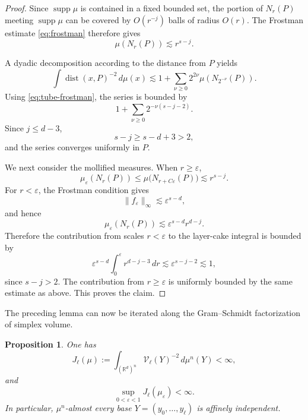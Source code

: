 \documentclass[11pt]{article}
\newtheorem{proposition}[theorem]{Proposition}
\theoremstyle{remark}
\newcommand{\R}{\mathbb R}
\newcommand{\supp}{\operatorname{supp}}
\newcommand{\dist}{\operatorname{dist}}
\newcommand{\eps}{\varepsilon}
\numberwithin{equation}{section}
\newcommand{\1}{\mathbf 1}
\begin{document}
\begin{proof}
Since \(\supp\mu\) is contained in a fixed bounded set, the portion of
\(N_r(P)\) meeting \(\supp\mu\) can be covered by \(O(r^{-j})\) balls
of radius \(O(r)\).  The Frostman estimate \eqref{eq:frostman} therefore
gives
\begin{equation}
\mu(N_r(P))
\lesssim
r^{s-j}.
\label{eq:tube-frostman}
\end{equation}

A dyadic decomposition according to the distance from \(P\) yields
\[
\int \dist(x,P)^{-2}\,d\mu(x)
\lesssim
1+
\sum_{\nu\geq0}
2^{2\nu}\mu(N_{2^{-\nu}}(P)).
\]
Using \eqref{eq:tube-frostman}, the series is bounded by
\[
1+
\sum_{\nu\geq0}
2^{-\nu(s-j-2)}.
\]
Since \(j\leq d-3\),
\[
s-j
\geq
s-d+3
>
2,
\]
and the series converges uniformly in \(P\).

We next consider the mollified measures.  When \(r\geq\eps\),
\[
\mu_\eps(N_r(P))
\leq
\mu\bigl(N_{r+C\eps}(P)\bigr)
\lesssim
r^{s-j}.
\]
For \(r<\eps\), the Frostman condition gives
\[
\|f_\eps\|_\infty
\lesssim
\eps^{s-d},
\]
and hence
\[
\mu_\eps(N_r(P))
\lesssim
\eps^{s-d}r^{d-j}.
\]
Therefore the contribution from scales \(r<\eps\) to the layer-cake
integral is bounded by
\[
\eps^{s-d}
\int_0^\eps r^{d-j-3}\,dr
\lesssim
\eps^{s-j-2}
\lesssim
1,
\]
since \(s-j>2\).  The contribution from \(r\geq\eps\) is uniformly
bounded by the same estimate as above.  This proves the claim.
\end{proof}

The preceding lemma can now be iterated along the Gram--Schmidt
factorization of simplex volume.

\begin{proposition}
\label{prop:inverse-volume}
One has
\begin{equation}
J_\ell(\mu)
:=
\int_{(\R^d)^n}
\mathcal V_\ell(Y)^{-2}\,d\mu^n(Y)
<\infty,
\label{eq:inverse-volume}
\end{equation}
and
\begin{equation}
\sup_{0<\eps<1}
J_\ell(\mu_\eps)
<\infty.
\label{eq:inverse-volume-mollified}
\end{equation}
In particular, \(\mu^n\)-almost every base
\(Y=(y_0,\ldots,y_\ell)\) is affinely independent.
\end{proposition}
\end{document}
